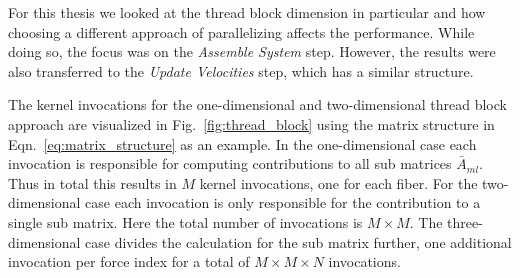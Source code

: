 For this thesis we looked at the thread block dimension in particular and how choosing a different approach of parallelizing affects the performance. While doing so, the focus was on the \emph{Assemble System} step. However, the results were also transferred to the \emph{Update Velocities} step, which has a similar structure.

The kernel invocations for the one-dimensional and two-dimensional thread block approach are visualized in Fig.~\ref{fig:thread_block} using the matrix structure in Eqn.~\eqref{eq:matrix_structure} as an example. In the one-dimensional case each invocation is responsible for computing contributions to all sub matrices $\bar{A}_{ml}$. Thus in total this results in $M$ kernel invocations, one for each fiber. For the two-dimensional case each invocation is only responsible for the contribution to a single sub matrix. Here the total number of invocations is $M \times M$. The three-dimensional case divides the calculation for the sub matrix further, one additional invocation per force index for a total of $M \times M \times N$ invocations.

